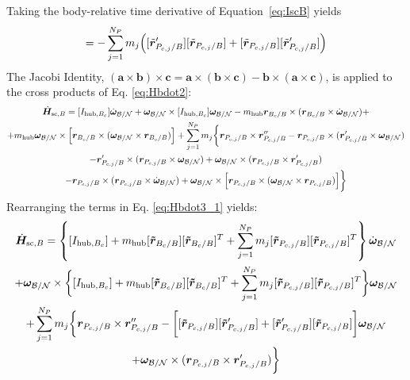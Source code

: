 \documentclass[]{BasiliskReportMemo}
\begin{document}
	Taking the body-relative time derivative of Equation~\eqref{eq:IscB} yields
	\begin{equation}
		[I'_{\text{sc},B}] = - \sum\limits_{j=1}^{N_P} m_j \Bigl(  [\tilde{\bm{r}}'_{P_{c,j}/B}] [\tilde{\bm{r}}_{P_{c,j}/B}] + [\tilde{\bm{r}}_{P_{c,j}/B}] [\tilde{\bm{r}}'_{P_{c,j}/B}]  \Bigr)
		\label{eq:Idotsc}
	\end{equation}
	The Jacobi Identity, $(\bm a \times \bm b)\times \bm c = \bm a \times (\bm b\times \bm c) - \bm        b \times (\bm a\times \bm c)$, is applied to the cross products of Eq. \eqref{eq:Hbdot2}:
	\begin{multline}
	\dot{\bm{H}}_{\text{sc},B} = [I_{\text{hub},B_c}] \dot{\bm\omega}_{\cal B/N} + \bm\omega_{\cal B/N} \times [I_{\text{hub},B_c}] \bm\omega_{\cal B/N} - m_{\text{hub}} \bm{r}_{B_c/B}\times (\bm{r}_{B_c/B}\times \dot{\bm\omega}_{\cal B/N})+\\ +m_{\text{hub}}  \bm\omega_{\cal B/N}\times \Bigl[\bm{r}_{B_c/B}\times(\bm\omega_{\cal B/N}\times \bm{r}_{B_c/B})\Bigr] + \sum\limits_{j=1}^{N_P}m_j \bigg\{ \bm r_{P_{c,j}/B}\times \bm{r}''_{P_{c,j}/B} -\bm r_{P_{c,j}/B}\times (\bm{r}'_{P_{c,j}/B}\times\bm\omega_{\cal B/N} )\\-
	\bm{r}'_{P_{c,j}/B}\times (\bm r_{P_{c,j}/B}\times\bm\omega_{\cal B/N})+\bm\omega_{\cal B/N}\times(\bm r_{P_{c,j}/B}\times\bm{r}'_{P_{c,j}/B})
	\\ - \bm r_{P_{c,j}/B}\times (\bm{r}_{P_{c,j}/B} \times \dot{\bm\omega}_{\cal B/N}) +\bm\omega_{\cal B/N} \times \Bigl[\bm r_{P_{c,j}/B}\times (\bm\omega_{\cal B/N} \times \bm{r}_{P_{c,j}/B})\Bigl]\bigg\}
	\label{eq:Hbdot3_1}
	\end{multline}
	Rearranging the terms in Eq. \eqref{eq:Hbdot3_1} yields:
	\begin{multline}
	\dot{\bm{H}}_{\text{sc},B} = \left\{[I_{\text{hub},B_c}] +m_{\text{hub}} [\bm{\tilde{r}}_{B_c/B}] [\bm{\tilde{r}}_{B_c/B}]^T+\sum\limits_{j=1}^{N_P}m_j [\bm{\tilde{r}}_{P_{c,j}/B}][\bm{\tilde{r}}_{P_{c,j}/B}]^T \right\} \dot{\bm\omega}_{\cal B/N} \\
	+ \bm\omega_{\cal B/N} \times \bigg \{[I_{\text{hub},B_c}] + m_{\text{hub}} [\bm{\tilde{r}}_{B_c/B}] [\bm{\tilde{r}}_{B_c/B}]^T +\sum\limits_{j=1}^{N_P}m_j [\bm{\tilde{r}}_{P_{c,j}/B}][\bm{\tilde{r}}_{P_{c,j}/B}]^T \bigg\}\bm\omega_{\cal B/N} \\ + \sum\limits_{j=1}^{N_P}m_j \bigg\{ \bm r_{P_{c,j}/B}\times \bm{r}''_{P_{c,j}/B} -\bigg[[\bm{\tilde{r}}_{P_{c,j}/B}][\bm{\tilde{r}}'_{P_{c,j}/B}]+[\bm{\tilde{r}}'_{P_{c,j}/B}][\bm{\tilde{r}}_{P_{c,j}/B}] \bigg]\bm\omega_{\cal B/N}\\
	+\bm\omega_{\cal B/N}\times(\bm r_{P_{c,j}/B}\times\bm{r}'_{P_{c,j}/B}) \bigg\}
	\label{eq:Hbdot3_2}
	\end{multline}
\end{document}
